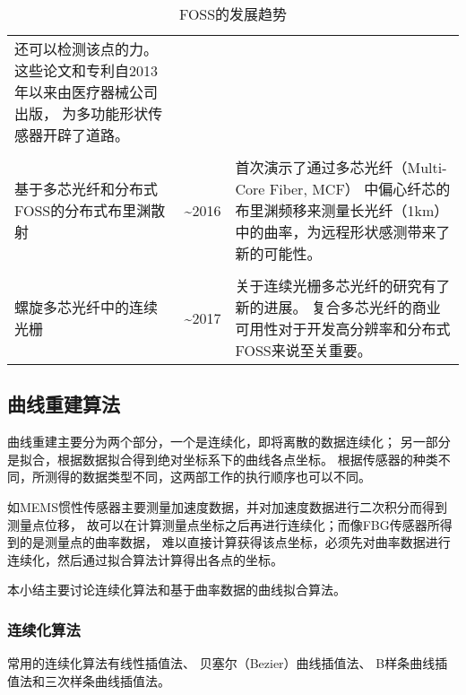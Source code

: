 \begin{table}[!htbp]
\begin{center}
\begin{tabular}{p{}cp{}}
还可以检测该点的力。这些论文和专利自2013年以来由医疗器械公司出版，
为多功能形状传感器开辟了道路。
\\
\\
基于多芯光纤和分布式FOSS的分布式布里渊散射 & \textasciitilde 2016 & 首次演示了通过多芯光纤（Multi-Core Fiber, MCF）
中偏心纤芯的布里渊频移来测量长光纤（1km）中的曲率，为远程形状感测带来了新的可能性。
\\
\\
螺旋多芯光纤中的连续光栅 & \textasciitilde 2017 & 关于连续光栅多芯光纤的研究有了新的进展。
复合多芯光纤的商业可用性对于开发高分辨率和分布式FOSS来说至关重要。
\\
\bottomrule
\end{tabular}
\caption{FOSS的发展趋势}
\end{center}
\end{table}

\subsection{曲线重建算法}
曲线重建主要分为两个部分，一个是连续化，即将离散的数据连续化；
另一部分是拟合，根据数据拟合得到绝对坐标系下的曲线各点坐标。
根据传感器的种类不同，所测得的数据类型不同，这两部工作的执行顺序也可以不同。

如MEMS惯性传感器主要测量加速度数据，并对加速度数据进行二次积分而得到测量点位移，
故可以在计算测量点坐标之后再进行连续化；而像FBG传感器所得到的是测量点的曲率数据，
难以直接计算获得该点坐标，必须先对曲率数据进行连续化，然后通过拟合算法计算得出各点的坐标。

本小结主要讨论连续化算法和基于曲率数据的曲线拟合算法。

\subsubsection{连续化算法}

常用的连续化算法有线性插值法、
贝塞尔（Bezier）曲线插值法、
B样条曲线插值法和三次样条曲线插值法。

